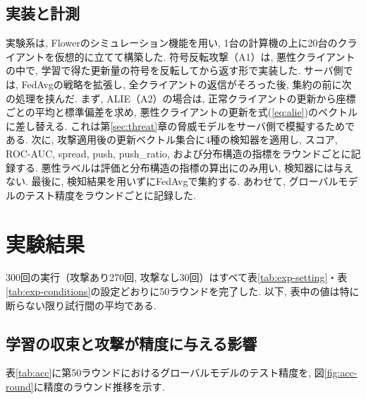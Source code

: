 \documentclass[a4j, dvipdfmx]{jsarticle}
\newcommand{\PushRatio}{\textrm{push\_ratio}}
\newcommand{\Spread}{\textrm{spread}}
\newcommand{\Push}{\textrm{push}}
\begin{document}
\subsection{実装と計測}
\label{sec:exp-impl}

実験系は, Flower\cite{beutel2020flower}のシミュレーション機能を用い, 1台の計算機の上に20台のクライアントを仮想的に立てて構築した. 符号反転攻撃（A1）は, 悪性クライアントの中で, 学習で得た更新量の符号を反転してから返す形で実装した. サーバ側では, FedAvgの戦略を拡張し, 全クライアントの返信がそろった後, 集約の前に次の処理を挟んだ. まず, ALIE（A2）の場合は, 正常クライアントの更新から座標ごとの平均と標準偏差を求め, 悪性クライアントの更新を式(\ref{eq:alie})のベクトルに差し替える. これは第\ref{sec:threat}章の脅威モデルをサーバ側で模擬するためである. 次に, 攻撃適用後の更新ベクトル集合に4種の検知器を適用し, スコア, ROC-AUC, \Spread{}, \Push{}, \PushRatio{}, および分布構造の指標をラウンドごとに記録する. 悪性ラベルは評価と分布構造の指標の算出にのみ用い, 検知器には与えない. 最後に, 検知結果を用いずにFedAvgで集約する. あわせて, グローバルモデルのテスト精度をラウンドごとに記録した.

\section{実験結果}
\label{sec:results}

300回の実行（攻撃あり270回, 攻撃なし30回）はすべて表\ref{tab:exp-setting}・表\ref{tab:exp-conditions}の設定どおりに50ラウンドを完了した. 以下, 表中の値は特に断らない限り試行間の平均である.

\subsection{学習の収束と攻撃が精度に与える影響}
\label{sec:res-acc}

表\ref{tab:acc}に第50ラウンドにおけるグローバルモデルのテスト精度を, 図\ref{fig:acc-round}に精度のラウンド推移を示す.
\end{document}
